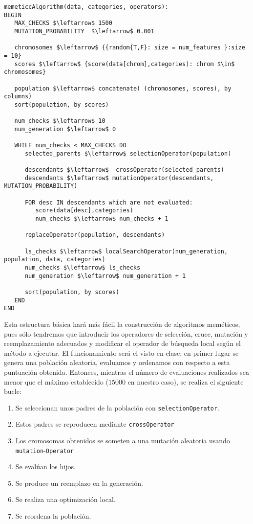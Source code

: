\documentclass[11pt,leqno]{article}
\begin{document}
\begin{lstlisting}[mathescape=true]
memeticcAlgorithm(data, categories, operators):
BEGIN
   MAX_CHECKS $\leftarrow$ 1500
   MUTATION_PROBABILITY  $\leftarrow$ 0.001
   
   chromosomes $\leftarrow$ {{random{T,F}: size = num_features }:size = 10}
   scores $\leftarrow$ {score(data[chrom],categories): chrom $\in$ chromosomes} 
   
   population $\leftarrow$ concatenate( (chromosomes, scores), by columns)
   sort(population, by scores)
   
   num_checks $\leftarrow$ 10
   num_generation $\leftarrow$ 0
   
   WHILE num_checks < MAX_CHECKS DO
      selected_parents $\leftarrow$ selectionOperator(population)
      
      descendants $\leftarrow$  crossOperator(selected_parents)
      descendants $\leftarrow$ mutationOperator(descendants, MUTATION_PROBABILITY)
                                                      
      FOR desc IN descendants which are not evaluated:
         score(data[desc],categories)
         num_checks $\leftarrow$ num_checks + 1

      replaceOperator(population, descendants)
      
      ls_checks $\leftarrow$ localSearchOperator(num_generation, population, data, categories)
      num_checks $\leftarrow$ ls_checks
      num_generation $\leftarrow$ num_generation + 1 
      
      sort(population, by scores)
   END
END
\end{lstlisting}	

	Esta estructura básica hará más fácil la construcción de algoritmos meméticos, pues sólo tendremos que introducir los operadores de selección, cruce, mutación y reemplazamiento adecuados y modificar el operador de búsqueda local según el método a ejecutar. El funcionamiento será el visto en clase: en primer lugar se genera una población aleatoria, evaluamos y ordenamos con respecto a esta puntuación obtenida. Entonces, mientras el número de evaluaciones realizados sea menor que el máximo establecido ($15000$ en nuestro caso), se realiza el siguiente bucle:
	
\begin{enumerate}[i]
\item Se seleccionan unos padres de la población con \texttt{selectionOperator}.
\item Estos padres se reproducen mediante \texttt{crossOperator}
\item Los cromosomas obtenidos se someten a una mutación aleatoria usando \texttt{mutation}-\texttt{Operator}
\item Se evalúan los hijos.
\item Se produce un reemplazo en la generación.
\item Se realiza una optimización local.
\item Se reordena la población.
\end{enumerate}
\end{document}
